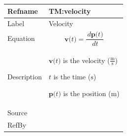 \documentclass[12pt]{article}
\begin{document}
\vspace{\baselineskip}
\noindent
\begin{minipage}{\textwidth}
\begin{tabular}{>{\raggedright}p{}>{\raggedright\arraybackslash}p{}}
\toprule \textbf{Refname} & \textbf{TM:velocity}
\label{TM:velocity}
\\ \midrule
Label & Velocity
        
\\ \midrule
Equation & \begin{displaymath}
           \symbf{v}\text{(}t\text{)}=\frac{\,d\symbf{p}\text{(}t\text{)}}{\,dt}
           \end{displaymath}
\\ \midrule
Description & \begin{symbDescription}
              \item{$\symbf{v}\text{(}t\text{)}$ is the velocity ($\frac{\text{m}}{\text{s}}$)}
              \item{$t$ is the time (${\text{s}}$)}
              \item{$\symbf{p}\text{(}t\text{)}$ is the position (${\text{m}}$)}
              \end{symbDescription}
\\ \midrule
Source & \cite{velocityWiki}
         
\\ \midrule
RefBy & 
\\ \bottomrule
\end{tabular}
\end{minipage}
\end{document}
